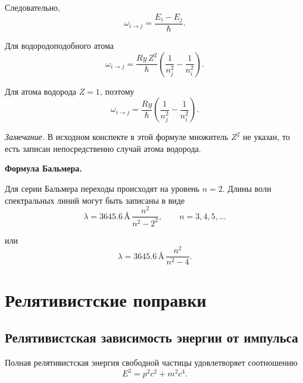 \documentclass[../final.tex]{subfiles}
\begin{document}
Следовательно,
%
\begin{equation*}
    \omega_{i\rightarrow j}
    =
    \frac{E_i-E_j}{\hbar}.
\end{equation*}

Для водородоподобного атома
%
\[
    \omega_{i\rightarrow j}
    =
    \frac{Ry\,Z^2}{\hbar}
    \left(
        \frac{1}{n_j^2}
        -
        \frac{1}{n_i^2}
    \right).
\]

Для атома водорода $Z=1$, поэтому
%
\begin{equation*}
    \omega_{i\rightarrow j}
    =
    \frac{Ry}{\hbar}
    \left(
        \frac{1}{n_j^2}
        -
        \frac{1}{n_i^2}
    \right).
\end{equation*}

\textit{Замечание.}
В исходном конспекте в этой формуле множитель $Z^2$ не указан,
то есть записан непосредственно случай атома водорода.


\medskip
\noindent\textbf{Формула Бальмера.}

Для серии Бальмера переходы происходят на уровень $n=2$.
Длины волн спектральных линий могут быть записаны в виде
%
\begin{equation*}
    \lambda
    =
    3645.6\,\text{\AA}\,
    \frac{n^2}{n^2-2^2},
    \qquad
    n=3,4,5,\ldots
\end{equation*}

или
%
\begin{equation*}
    \lambda
    =
    3645.6\,\text{\AA}\,
    \frac{n^2}{n^2-4}.
\end{equation*}


\section{Релятивистские поправки}


\subsection{Релятивистская зависимость энергии от импульса}

Полная релятивистская энергия свободной частицы удовлетворяет
соотношению
%
\begin{equation*}
    E^2
    =
    p^2c^2+m^2c^4.
\end{equation*}
\end{document}

